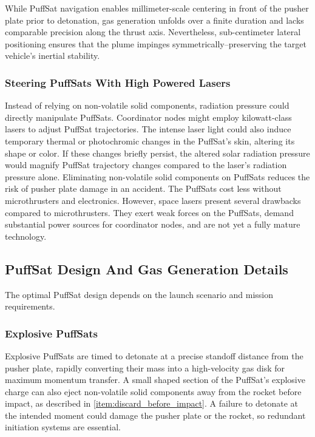 \documentclass{article}
\begin{document}
While PuffSat navigation enables millimeter-scale centering in front of the pusher plate prior to detonation, gas generation unfolds over a finite duration and lacks comparable precision along the thrust axis. Nevertheless, sub-centimeter lateral positioning ensures that the plume impinges symmetrically--preserving the target vehicle’s inertial stability.

\subsubsection{Steering PuffSats With High Powered Lasers}
Instead of relying on non-volatile solid components, radiation pressure could directly manipulate PuffSats. Coordinator nodes might employ kilowatt-class lasers to adjust PuffSat trajectories. The intense laser light could also induce temporary thermal or photochromic changes in the PuffSat's skin, altering its shape or color. If these changes briefly persist, the altered solar radiation pressure would magnify PuffSat trajectory changes compared to the laser's radiation pressure alone. Eliminating non-volatile solid components on PuffSats  reduces the risk of pusher plate damage in an accident.  The PuffSats cost less without microthrusters and electronics. However, space lasers present several drawbacks compared to microthrusters. They exert weak forces on the PuffSats, demand substantial power sources for coordinator nodes, and are not yet a fully mature technology. 

\subsection{PuffSat Design And Gas Generation Details}\label{sec:puffsat_design}
The optimal PuffSat design depends on the launch scenario and mission requirements.  
\subsubsection{Explosive PuffSats} \label{sec:explosive_puffsat}
Explosive PuffSats are timed to detonate at a precise standoff distance from the pusher plate, rapidly converting their mass into a high-velocity gas disk for maximum momentum transfer. A small shaped section of the PuffSat's explosive charge can also eject non-volatile solid components away from the rocket before impact, as described in \autoref{item:discard_before_impact}.  A failure to detonate at the intended moment could damage the pusher plate or the rocket, so redundant initiation systems are essential.
\end{document}
